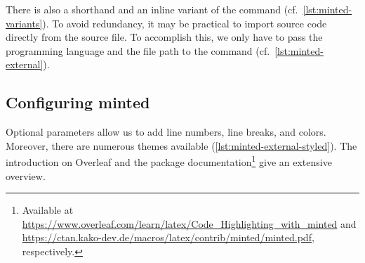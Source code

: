 
\noindent There is also a shorthand and an inline variant of the command (cf.\ \cref{lst:minted-variants}).
To avoid redundancy, it may be practical to import source code directly from the source file.
To accomplish this, we only have to pass the programming language and the file path to the  command (cf.\ \cref{lst:minted-external}).


\subsection{Configuring minted}
Optional parameters allow us to add line numbers, line breaks, and colors.
Moreover, there are numerous themes available (\cref{lst:minted-external-styled}).
The introduction on Overleaf and the package documentation\footnote{Available at \url{https://www.overleaf.com/learn/latex/Code_Highlighting_with_minted} and \url{https://ctan.kako-dev.de/macros/latex/contrib/minted/minted.pdf}, respectively.} give an extensive overview.

